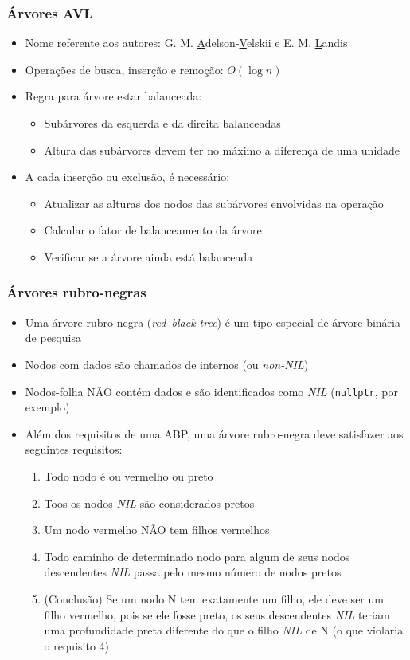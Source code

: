 \documentclass[aspectratio=169]{beamer}
\begin{document}
\begin{frame}\frametitle{Árvores AVL}
\begin{itemize}
	\item Nome referente aos autores: G. M. \underline{A}delson-\underline{V}elskii e E. M. \underline{L}andis
	\item Operações de busca, inserção e remoção: $O(\log{n})$	
	\item Regra para árvore estar balanceada:
	\begin{itemize}
		\item Subárvores da esquerda e da direita balanceadas
		\item Altura das subárvores devem ter no máximo a diferença de uma unidade
	\end{itemize}
	\item A cada inserção ou exclusão, é necessário:
	\begin{itemize}
		\item Atualizar as alturas dos nodos das subárvores envolvidas na operação
		\item Calcular o fator de balanceamento da árvore
		\item Verificar se a árvore ainda está balanceada
	\end{itemize}
\end{itemize}
\end{frame}

\begin{frame}\frametitle{Árvores rubro-negras}
\begin{itemize}
	\item Uma árvore rubro-negra (\emph{red–black tree}) é um tipo especial de árvore binária de pesquisa
	\item Nodos com dados são chamados de internos (ou \emph{non-NIL})
	\item Nodos-folha NÃO contém dados e são identificados como \emph{NIL} (\texttt{nullptr}, por exemplo)
	\item Além dos requisitos de uma ABP, uma árvore rubro-negra deve satisfazer aos seguintes requisitos:
	\begin{enumerate}
		\item Todo nodo é ou vermelho ou preto
		\item Toos os nodos \emph{NIL} são considerados pretos
		\item Um nodo vermelho NÃO tem filhos vermelhos
		\item Todo caminho de determinado nodo para algum de seus nodos descendentes \emph{NIL} passa pelo mesmo número de nodos pretos
		\item (Conclusão) Se um nodo N tem exatamente um filho, ele deve ser um filho vermelho, pois se ele fosse preto, os seus descendentes \emph{NIL} teriam uma profundidade preta diferente do que o filho \emph{NIL} de N (o que violaria o requisito 4)
	\end{enumerate}
\end{itemize}
\end{frame}
\end{document}
